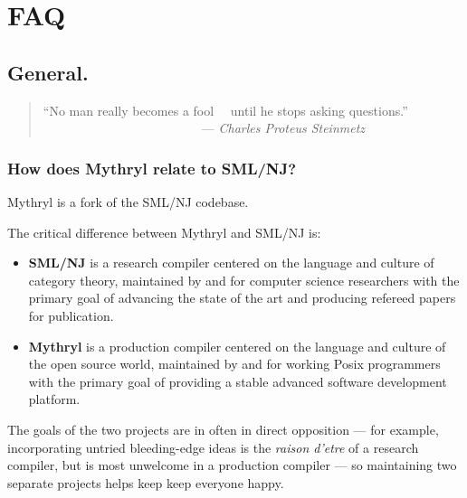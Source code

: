 \chapter{FAQ}

%
%

\section{General.}

\begin{quote}\begin{tiny}
                ``No man really becomes a fool\newline
                ~~until he stops asking questions.''\newline
                ~~~~~~~~~~~~~~~~~~~~~~~~~--- {\em Charles Proteus Steinmetz}
\end{tiny}\end{quote}

\subsection{How does Mythryl relate to SML/NJ?}

Mythryl is a fork of the SML/NJ codebase.

The critical difference between Mythryl and {\sc SML/NJ} is:
\begin{itemize}
\item {\bf {\sc SML/NJ}} is a research compiler centered on the language and 
culture of category theory, maintained by and for computer science 
researchers with the primary goal of advancing the state 
of the art and producing refereed papers for publication.
\item {\bf Mythryl} is a production compiler centered on the 
language and culture of the open source world, maintained 
by and for working Posix programmers with the primary goal 
of providing a stable advanced software development 
platform.
\end{itemize}

The goals of the two projects are in often in direct 
opposition --- for example, incorporating untried 
bleeding-edge ideas is the {\it raison d'etre} of a research 
compiler, but is most unwelcome in a production compiler 
--- so maintaining two separate projects helps keep 
keep everyone happy.


